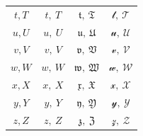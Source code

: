 \documentclass{ctexart}
\begin{document}
\begin{center}
\begin{tabular}{c c c c}
$t, T$ & $t,\ T$ & $\mathfrak{t},\ \mathfrak{T}$ & $\mathcal{t},\ \mathcal{T}$ \\
$u, U$ & $u,\ U$ & $\mathfrak{u},\ \mathfrak{U}$ & $\mathcal{u},\ \mathcal{U}$ \\
$v, V$ & $v,\ V$ & $\mathfrak{v},\ \mathfrak{V}$ & $\mathcal{v},\ \mathcal{V}$ \\
$w, W$ & $w,\ W$ & $\mathfrak{w},\ \mathfrak{W}$ & $\mathcal{w},\ \mathcal{W}$ \\
$x, X$ & $x,\ X$ & $\mathfrak{x},\ \mathfrak{X}$ & $\mathcal{x},\ \mathcal{X}$ \\
$y, Y$ & $y,\ Y$ & $\mathfrak{y},\ \mathfrak{Y}$ & $\mathcal{y},\ \mathcal{Y}$ \\
$z, Z$ & $z,\ Z$ & $\mathfrak{z},\ \mathfrak{Z}$ & $\mathcal{z},\ \mathcal{Z}$ \\
\bottomrule
\end{tabular}
\end{center}
\end{document}
